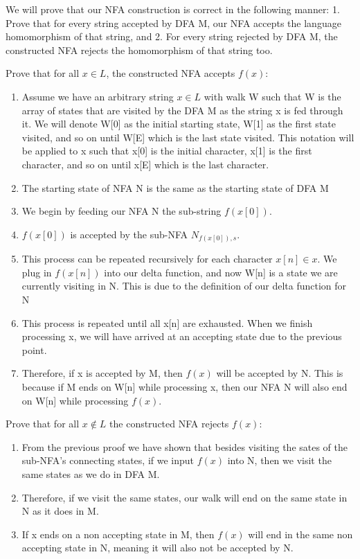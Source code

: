 \documentclass[11pt, letterpaper]{article}
\begin{document}
\bigbreak

We will prove that our NFA construction is correct in the following manner: 1. Prove that for every string accepted by DFA M, our NFA accepts the language homomorphism of that string, and 2. For every string rejected by DFA M, the constructed NFA rejects the homomorphism of that string too.

\bigbreak

Prove that for all $x \in L$, the constructed NFA accepts $f(x)$:

\begin{enumerate}

\item Assume we have an arbitrary string $x \in L$ with walk W such that W is the array of states that are visited by the DFA M as the string x is fed through it. We will denote W[0] as the initial starting state, W[1] as the first state visited, and so on until W[E] which is the last state visited. This notation will be applied to x such that x[0] is the initial character, x[1] is the first character, and so on until x[E] which is the last character.
\item The starting state of NFA N is the same as the starting state of DFA M
\item We begin by feeding our NFA N the sub-string $f(x[0])$. 
\item $f(x[0])$ is accepted by the sub-NFA $N_{f(x[0]),s}$.
\item This process can be repeated recursively for each character $x[n] \in x$. We plug in $f(x[n])$ into our delta function, and now W[n] is a state we are currently visiting in N. This is due to the definition of our delta function for N
\item This process is repeated until all x[n] are exhausted. When we finish processing x, we will have arrived at an accepting state due to the previous point.
\item Therefore, if x is accepted by M, then $f(x)$ will be accepted by N. This is because if M ends on W[n] while processing x, then our NFA N will also end on W[n] while processing $f(x)$.

\end{enumerate}

\bigbreak

Prove that for all $x \notin L$ the constructed NFA rejects $f(x)$:

\begin{enumerate}
\item From the previous proof we have shown that besides visiting the sates of the sub-NFA's connecting states, if we input $f(x)$ into N, then we visit the same states as we do in DFA M.
\item Therefore, if we visit the same states, our walk will end on the same state in N as it does in M.
\item If x ends on a non accepting state in M, then $f(x)$ will end in the same non accepting state in N, meaning it will also not be accepted by N.
\end{enumerate}
\end{document}
